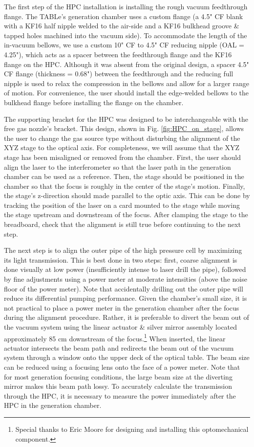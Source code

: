 The first step of the HPC installation is installing the rough vacuum feedthrough flange. The TABLe's generation chamber uses a custom flange (a 4.5" CF blank with a KF16 half nipple welded to the air-side and a KF16 bulkhead groove \& tapped holes machined into the vacuum side). To accommodate the length of the in-vacuum bellows, we use a custom 10" CF to 4.5" CF reducing nipple (OAL = 4.25"), which acts as a spacer between the feedthrough flange and the KF16 flange on the HPC. Although it was absent from the original design, a spacer 4.5" CF flange (thickness = 0.68") between the feedthrough and the reducing full nipple is used to relax the compression in the bellows and allow for a larger range of motion. For convenience, the user should install the edge-welded bellows to the bulkhead flange before installing the flange on the chamber.

The supporting bracket for the HPC was designed to be interchangeable with the free gas nozzle's bracket. This design, shown in Fig. \ref{fig:HPC_on_stage}, allows the user to change the gas source type without disturbing the alignment of the XYZ stage to the optical axis. For completeness, we will assume that the XYZ stage has been misaligned or removed from the chamber. First, the user should align the laser to the interferometer so that the laser path in the generation chamber can be used as a reference. Then, the stage should be positioned in the chamber so that the focus is roughly in the center of the stage's motion. Finally, the stage's z-direction should made parallel to the optic axis. This can be done by tracking the position of the laser on a card mounted to the stage while moving the stage upstream and downstream of the focus. After clamping the stage to the breadboard, check that the alignment is still true before continuing to the next step.

The next step is to align the outer pipe of the high pressure cell by maximizing its light transmission. This is best done in two steps: first, coarse alignment is done visually at low power (insufficiently intense to laser drill the pipe), followed by fine adjustments using a power meter at moderate intensities (above the noise floor of the power meter). Note that accidentally drilling out the outer pipe will reduce its differential pumping performance. Given the chamber's small size, it is not practical to place a power meter in the generation chamber after the focus during the alignment procedure. Rather, it is preferable to divert the beam out of the vacuum system using the linear actuator \& silver mirror assembly located approximately 85 cm downstream of the focus.\footnote{Special thanks to Eric Moore for designing and installing this optomechanical component.} When inserted, the linear actuator intersects the beam path and redirects the beam out of the vacuum system through a window onto the upper deck of the optical table. The beam size can be reduced using a focusing lens onto the face of a power meter. Note that for most generation focusing conditions, the large beam size at the diverting mirror makes this beam path lossy. To accurately calculate the transmission through the HPC, it is necessary to measure the power immediately after the HPC in the generation chamber.

